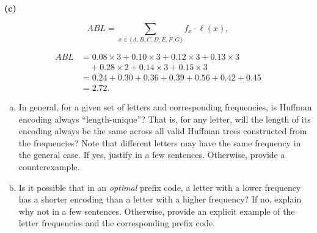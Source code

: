 \documentclass[11pt]{article}
\begin{document}
    \bigskip
    \textbf{(c) }

    \[
    ABL = \sum_{x \in \{A,B,C,D,E,F,G\}} f_x \cdot \ell(x),
    \]

    \[
    \begin{aligned}
    ABL &= 0.08 \times 3 + 0.10 \times 3 + 0.12 \times 3 + 0.13 \times 3 \\
        &\quad + 0.28 \times 2 + 0.14 \times 3 + 0.15 \times 3 \\
        &= 0.24 + 0.30 + 0.36 + 0.39 + 0.56 + 0.42 + 0.45 \\
        &= 2.72.
    \end{aligned}
    \]
    \newpage

    \begin{tcolorbox}[title={Problem 4 (Huffman Encoding, Short Answers, 15 points)}] \setlength\parindent{1em}
        \begin{enumerate}[(a)]
        \item In general, for a given set of letters and corresponding frequencies, is Huffman encoding always ``length-unique''? That is, for any letter, will the length of its encoding always be the same across all valid Huffman trees constructed from the frequencies? Note that different letters may have the same frequency in the general case. If yes, justify in a few sentences. Otherwise, provide a counterexample.
        \item Is it possible that in an \emph{optimal} prefix code, a letter with a lower frequency has a shorter encoding than a
        letter with a higher frequency? If no, explain why not in a few sentences. Otherwise, provide an explicit example of the letter frequencies and the corresponding prefix code.
        \end{enumerate}    
    \end{tcolorbox}
    
\end{document}
